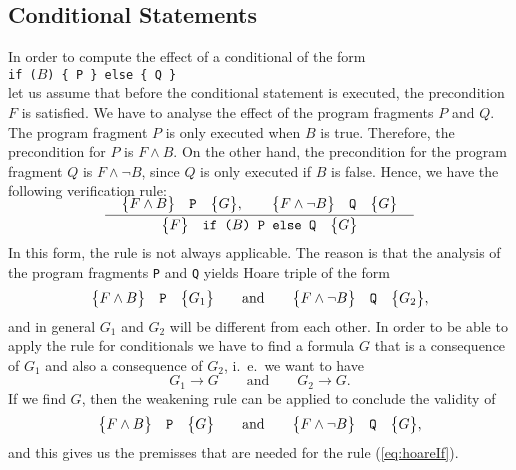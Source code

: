 \subsection{Conditional Statements}
In order to compute the effect of a conditional of the form
\\[0.2cm]
\hspace*{1.3cm}
\texttt{if ($B$) \{ P \} else \{  Q \}}
\\[0.2cm]
let us assume that before the conditional statement is executed, the
precondition $F$ is satisfied.   We have to analyse the effect of the program fragments $P$ and $Q$.
The program fragment $P$ is only executed when $B$ is true.  Therefore, the precondition for $P$ is 
$F \wedge B$.  On the other hand, the precondition for the program fragment $Q$ is $F \wedge \neg B$,
since $Q$ is only executed if $B$ is false.
Hence, we have the following verification rule:
\begin{equation}
  \label{eq:hoareIf}
  \bruch{\quad\hoare{F \wedge B}{P}{G}, \qquad \hoare{F \wedge \neg B}{Q}{G}\quad}{
              \hoare{F}{if ($B$) P else Q}{G}}  
\end{equation}
In this form, the rule is not always applicable.  The reason is that the analysis of the program
fragments \texttt{P} and \texttt{Q} yields Hoare triple of the form
\begin{equation}
  \label{eq:hoareI}
 \bigl\{F \wedge B\bigr\}\quad\texttt{P}\quad\bigl\{G_1\bigr\} \qquad \mathrm{and} \qquad \bigl\{F \wedge \neg B\bigr\}\quad\texttt{Q}\quad\bigl\{G_2\bigr\},   
\end{equation}
and in general $G_1$ and $G_2$ will be different from each other.  In order to be able to apply the
rule for conditionals we have to find a formula $G$ that is a consequence of $G_1$ and also a
consequence of $G_2$, i.~e.~we want to have
\[ G_1 \rightarrow G \qquad \mathrm{and} \qquad G_2 \rightarrow G. \]
If we find $G$, then the weakening rule  can be applied to conclude the validity of
\[ \bigl\{F \wedge B\bigr\}\quad\texttt{P}\quad\bigl\{G\bigr\} \qquad \mathrm{and} \qquad \bigl\{F \wedge \neg B\bigr\}\quad\texttt{Q}\quad\bigl\{G\bigr\},    \] 
and this gives us the premisses that are needed for the rule
(\ref{eq:hoareIf}).

